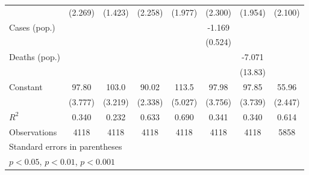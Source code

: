 \documentclass{article}
\begin{document}
{\begin{longtable}{l*{7}{c}}
                &  (2.269)         &  (1.423)         &  (2.258)         &  (1.977)         &  (2.300)         &  (1.954)         &  (2.100)         \\
Cases (pop.)    &                  &                  &                  &                  &   -1.169\sym{*}  &                  &                  \\
                &                  &                  &                  &                  &  (0.524)         &                  &                  \\
Deaths (pop.)   &                  &                  &                  &                  &                  &   -7.071         &                  \\
                &                  &                  &                  &                  &                  &  (13.83)         &                  \\
Constant        &    97.80\sym{***}&    103.0\sym{***}&    90.02\sym{***}&    113.5\sym{***}&    97.98\sym{***}&    97.85\sym{***}&    55.96\sym{***}\\
                &  (3.777)         &  (3.219)         &  (2.338)         &  (5.027)         &  (3.756)         &  (3.739)         &  (2.447)         \\
\hline
\(R^{2}\)       &    0.340         &    0.232         &    0.633         &    0.690         &    0.341         &    0.340         &    0.614         \\
Observations    &     4118         &     4118         &     4118         &     4118         &     4118         &     4118         &     5858         \\
\hline\hline
\multicolumn{8}{l}{\footnotesize Standard errors in parentheses}\\
\multicolumn{8}{l}{\footnotesize \sym{*} \(p<0.05\), \sym{**} \(p<0.01\), \sym{***} \(p<0.001\)}\\
\end{longtable}
}
\end{document}
